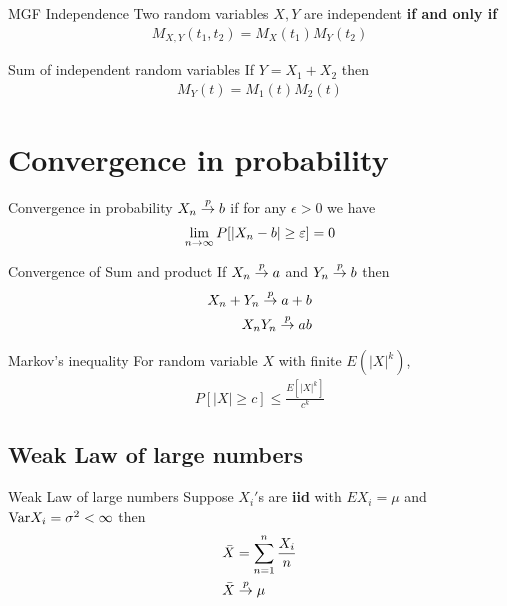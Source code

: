 \documentclass[16pt,a4paper]{article}
\begin{document}
\begin{thm}{MGF Independence}
    Two random variables $X,Y$ are independent  \textbf{if and only if}
    \begin{align*}
        M_{X,Y}(t_1, t_2) = M_X(t_1)M_Y(t_2)
    \end{align*} 
\end{thm}

\begin{thm}{ Sum of independent random variables}
    If $Y = X_1 + X_2$ then 
    \begin{align*}
        M_Y(t)  = M_1(t)M_2(t)
    \end{align*}
\end{thm}
\newpage
\section{Convergence in probability}
\begin{defn}{Convergence in probability}
    $X_n \overset{p}{\to} b$ if for any $\epsilon > 0$ we have 
    \begin{align*}
        \lim\limits_{n \rightarrow \infty} P[|X_n-b| \geq \varepsilon ] = 0
    \end{align*}
\end{defn}
\begin{thm}{Convergence of Sum and product}
    If $X_n \overset{p}{\to} a$ and $Y_n \overset{p}{\to} b$ then 
    \begin{align*}
        X_n + Y_n \overset{p}{\to} a+b\\
        X_nY_n \overset{p}{\to} ab
    \end{align*}
\end{thm}
\begin{thm}{Markov's inequality}
    For random variable $X$ with finite $E(|X|^k)$, 
    \begin{align*}
        P[|X| \geq c] \leq \frac{E[|X|^k]}{c^k}
    \end{align*}
\end{thm}
\subsection{Weak Law of large numbers}
\begin{thm}{Weak Law of large numbers}
    Suppose $X_i'$s are \textbf{iid} with $EX_i = \mu$ and $\mathrm{Var} X_i = \sigma^2 < \infty$ then 
    \begin{align*}
        &\bar{X} = \sum_{n=1}^n \frac{X_i}{n}\\
        &\bar{X} \overset{p}{\to} \mu
    \end{align*}
\end{thm}
\end{document}
